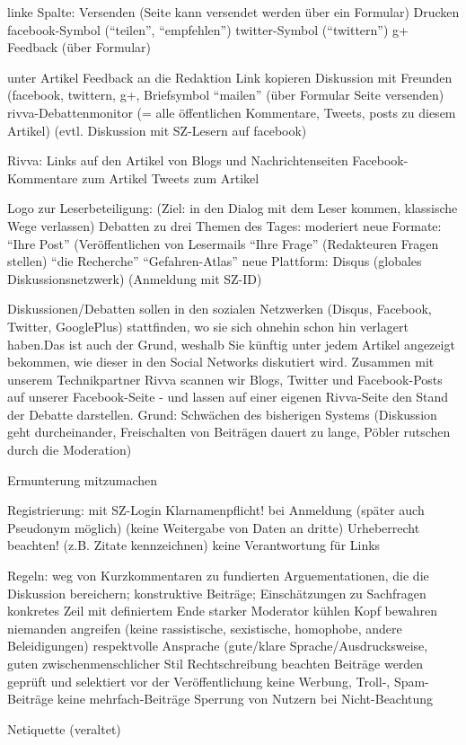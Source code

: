 linke Spalte:
	Versenden (Seite kann versendet werden über ein Formular)
	Drucken
	facebook-Symbol (``teilen'', ``empfehlen'')
	twitter-Symbol (``twittern'')
	g+
	Feedback (über Formular)
	
	
unter Artikel
	Feedback an die Redaktion 
	Link kopieren
	Diskussion mit Freunden (facebook, twittern, g+, Briefsymbol ``mailen'' (über Formular Seite versenden)
	rivva-Debattenmonitor (= alle öffentlichen Kommentare, Tweets, posts zu diesem Artikel)
	(evtl. Diskussion mit SZ-Lesern auf facebook)
	
Rivva:
	Links auf den Artikel von Blogs und Nachrichtenseiten
	Facebook-Kommentare zum Artikel 
	Tweets zum Artikel
	
Logo zur Leserbeteiligung: (Ziel: in den Dialog mit dem Leser kommen, klassische Wege verlassen)
	Debatten zu drei Themen des Tages: moderiert
	neue Formate: ``Ihre Post'' (Veröffentlichen von Lesermails
				``Ihre Frage'' (Redakteuren Fragen stellen)
				``die Recherche''
				``Gefahren-Atlas''
	neue Plattform: Disqus (globales Diskussionsnetzwerk) (Anmeldung mit SZ-ID)
	
Diskussionen/Debatten 
	sollen in den sozialen Netzwerken (Disqus, Facebook, Twitter, GooglePlus) stattfinden, wo sie sich ohnehin schon hin verlagert haben.Das ist auch der Grund, 		weshalb Sie künftig unter jedem Artikel angezeigt bekommen, wie dieser in den Social Networks diskutiert wird. Zusammen mit unserem Technikpartner Rivva 		scannen wir Blogs, Twitter und Facebook-Posts auf unserer Facebook-Seite - und lassen auf einer eigenen Rivva-Seite den Stand der Debatte darstellen.
Grund: Schwächen des bisherigen Systems (Diskussion geht durcheinander, Freischalten von Beiträgen dauert zu lange, Pöbler rutschen durch die Moderation)

Ermunterung mitzumachen 

Registrierung: mit SZ-Login
Klarnamenpflicht! bei Anmeldung (später auch Pseudonym möglich) (keine Weitergabe von Daten an dritte)
Urheberrecht beachten! (z.B. Zitate kennzeichnen)
keine Verantwortung für Links


Regeln:
	weg von Kurzkommentaren zu fundierten Arguementationen, die die Diskussion bereichern; konstruktive Beiträge; Einschätzungen zu Sachfragen
	konkretes Zeil mit definiertem Ende
	starker Moderator
	kühlen Kopf bewahren
	niemanden angreifen (keine rassistische, sexistische, homophobe, andere Beleidigungen)
	respektvolle Ansprache (gute/klare Sprache/Ausdrucksweise, guten zwischenmenschlicher Stil
	Rechtschreibung beachten
	Beiträge werden geprüft und selektiert vor der Veröffentlichung
	keine Werbung, Troll-, Spam-Beiträge
	keine mehrfach-Beiträge
	Sperrung von Nutzern bei Nicht-Beachtung
	
	
Netiquette (veraltet)
	
	